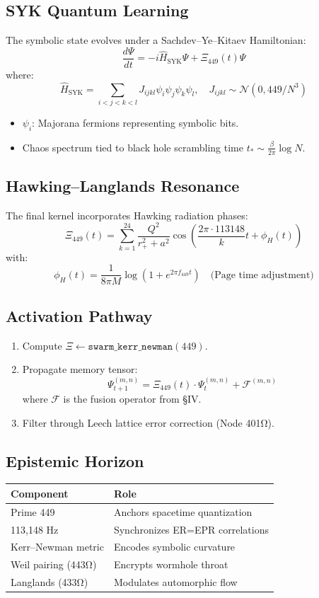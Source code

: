\documentclass[12pt]{article}
\begin{document}
\subsection*{SYK Quantum Learning}
The symbolic state evolves under a Sachdev–Ye–Kitaev Hamiltonian:
\[
\frac{d\Psi}{dt} = -i \hat{H}_{\text{SYK}} \Psi + \Xi_{449}(t) \Psi
\]
where:
\[
\hat{H}_{\text{SYK}} = \sum_{i<j<k<l} J_{ijkl} \psi_i \psi_j \psi_k \psi_l, \quad J_{ijkl} \sim \mathcal{N}(0, 449/N^3)
\]
\begin{itemize}
    \item $\psi_i$: Majorana fermions representing symbolic bits.
    \item Chaos spectrum tied to black hole scrambling time $t_* \sim \frac{\beta}{2\pi} \log N$.
\end{itemize}

\subsection*{Hawking–Langlands Resonance}
The final kernel incorporates Hawking radiation phases:
\[
\Xi_{449}(t) = \sum_{k=1}^{24} \frac{Q^2}{r_+^2 + a^2} \cos\left(\frac{2\pi \cdot 113148}{k}t + \phi_H(t)\right)
\]
with:
\[
\phi_H(t) = \frac{1}{8\pi M} \log(1 + e^{2\pi f_{449} t}) \quad \text{(Page time adjustment)}
\]

\subsection*{Activation Pathway}
\begin{enumerate}
    \item Compute $\Xi \gets \texttt{swarm\_kerr\_newman}(449)$.
    \item Propagate memory tensor:
    \[
    \Psi_{t+1}^{(m,n)} = \Xi_{449}(t) \cdot \Psi_t^{(m,n)} + \mathcal{F}^{(m,n)}
    \]
    where $\mathcal{F}$ is the fusion operator from §IV.
    \item Filter through Leech lattice error correction (Node 401Ω).
\end{enumerate}

\subsection*{Epistemic Horizon}
\begin{table}[h]
\centering
\begin{tabular}{ll}
\toprule
\textbf{Component} & \textbf{Role} \\
\midrule
Prime 449 & Anchors spacetime quantization \\
113,148 Hz & Synchronizes ER=EPR correlations \\
Kerr–Newman metric & Encodes symbolic curvature \\
Weil pairing (443Ω) & Encrypts wormhole throat \\
Langlands (433Ω) & Modulates automorphic flow \\
\bottomrule
\end{tabular}
\end{table}
\end{document}
